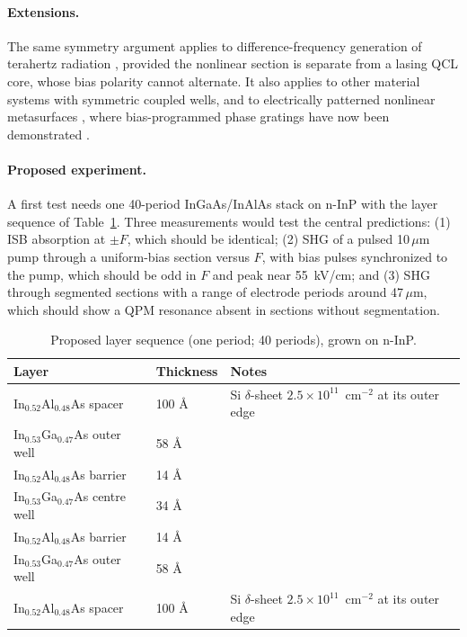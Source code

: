 \documentclass[11pt]{article}
\newcommand{\um}{\,\mu\mathrm{m}}
\begin{document}
\paragraph{Extensions.} The same symmetry argument applies to difference-frequency generation of terahertz radiation \cite{Belkin2007,Fujita2018}, provided the nonlinear section is separate from a lasing QCL core, whose bias polarity cannot alternate. It also applies to other material systems with symmetric coupled wells, and to electrically patterned nonlinear metasurfaces \cite{Yu2024,Yu2025}, where bias-programmed phase gratings have now been demonstrated \cite{Yu2025}.

\paragraph{Proposed experiment.} A first test needs one 40-period InGaAs/InAlAs stack on n-InP with the layer sequence of Table~\ref{tab:design}. Three measurements would test the central predictions: (1) ISB absorption at $\pm F$, which should be identical; (2) SHG of a pulsed 10$\um$ pump through a uniform-bias section versus $F$, with bias pulses synchronized to the pump, which should be odd in $F$ and peak near 55~kV/cm; and (3) SHG through segmented sections with a range of electrode periods around 47$\um$, which should show a QPM resonance absent in sections without segmentation.

\begin{table}[t]
\centering\small
\caption{Proposed layer sequence (one period; 40 periods), grown on n-InP.}\label{tab:design}
\begin{tabular}{@{}lll@{}}
\toprule
Layer & Thickness & Notes \\ \midrule
In$_{0.52}$Al$_{0.48}$As spacer & 100 \AA & Si $\delta$-sheet $2.5\times10^{11}$~cm$^{-2}$ at its outer edge \\
In$_{0.53}$Ga$_{0.47}$As outer well & 58 \AA & \\
In$_{0.52}$Al$_{0.48}$As barrier & 14 \AA & \\
In$_{0.53}$Ga$_{0.47}$As centre well & 34 \AA & \\
In$_{0.52}$Al$_{0.48}$As barrier & 14 \AA & \\
In$_{0.53}$Ga$_{0.47}$As outer well & 58 \AA & \\
In$_{0.52}$Al$_{0.48}$As spacer & 100 \AA & Si $\delta$-sheet $2.5\times10^{11}$~cm$^{-2}$ at its outer edge \\ \bottomrule
\end{tabular}
\end{table}
\end{document}
